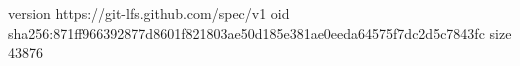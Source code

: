 version https://git-lfs.github.com/spec/v1
oid sha256:871ff966392877d8601f821803ae50d185e381ae0eeda64575f7dc2d5c7843fc
size 43876
